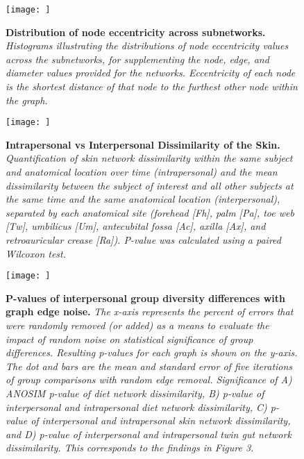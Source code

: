 \documentclass[12pt,]{article}
\begin{document}
\newpage

\begin{figure}[htbp]
\centering
\texttt{[image: ]}
\caption{\textbf{Distribution of node eccentricity across subnetworks.}
\emph{Histograms illustrating the distributions of node eccentricity
values across the subnetworks, for supplementing the node, edge, and
diameter values provided for the networks. Eccentricity of each node is
the shortest distance of that node to the furthest other node within the
graph.}\label{eccplot}}
\end{figure}

\newpage

\begin{figure}[htbp]
\centering
\texttt{[image: ]}
\caption{\textbf{Intrapersonal vs Interpersonal Dissimilarity of the
Skin.} \emph{Quantification of skin network dissimilarity within the
same subject and anatomical location over time (intrapersonal) and the
mean dissimilarity between the subject of interest and all other
subjects at the same time and the same anatomical location
(interpersonal), separated by each anatomical site (forehead {[}Fh{]},
palm {[}Pa{]}, toe web {[}Tw{]}, umbilicus {[}Um{]}, antecubital fossa
{[}Ac{]}, axilla {[}Ax{]}, and retroauricular crease {[}Ra{]}). P-value
was calculated using a paired Wilcoxon test.}\label{allskin}}
\end{figure}

\newpage

\begin{figure}[htbp]
\centering
\texttt{[image: ]}
\caption{\textbf{P-values of interpersonal group diversity differences
with graph edge noise.} \emph{The x-axis represents the percent of
errors that were randomly removed (or added) as a means to evaluate the
impact of random noise on statistical significance of group differences.
Resulting p-values for each graph is shown on the y-axis. The dot and
bars are the mean and standard error of five iterations of group
comparisons with random edge removal. Significance of A) ANOSIM p-value
of diet network dissimilarity, B) p-value of interpersonal and
intrapersonal diet network dissimilarity, C) p-value of interpersonal
and intrapersonal skin network dissimilarity, and D) p-value of
interpersonal and intrapersonal twin gut network dissimilarity. This
corresponds to the findings in Figure 3.}\label{idivnoise}}
\end{figure}

\newpage
\end{document}
